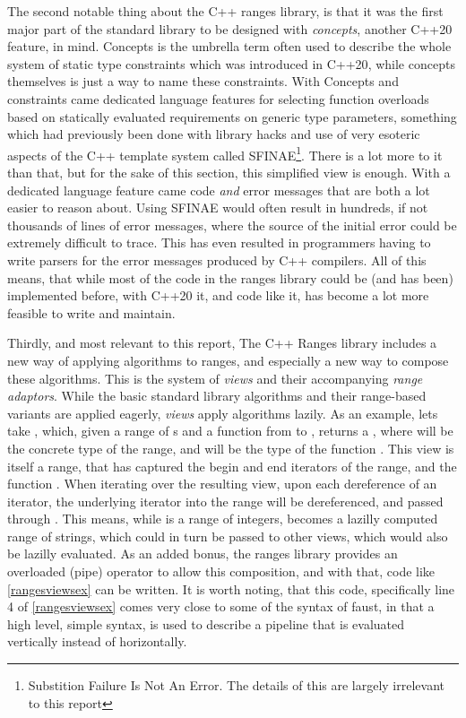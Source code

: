 The second notable thing about the C++ ranges library, is that it was the first major part of the standard library to be designed with \emph{concepts}, another C++20 feature\autocite{N4674}, in mind. Concepts is the umbrella term often used to describe the whole system of static type constraints which was introduced in C++20\autocite{P0724R0}, while concepts themselves is just a way to name these constraints. With Concepts and constraints came dedicated language features for selecting function overloads based on statically evaluated requirements on generic type parameters, something which had previously been done with library hacks  and use of very esoteric aspects of the C++ template system called SFINAE\footnote{Substition Failure Is Not An Error. The details of this are largely irrelevant to this report}. There is a lot more to it than that, but for the sake of this section, this simplified view is enough. With a dedicated language feature came code \emph{and} error messages that are both a lot easier to reason about. Using SFINAE would often result in hundreds, if not thousands of lines of error messages, where the source of the initial error could be extremely difficult to trace. This has even resulted in programmers having to write parsers for the error messages produced by C++ compilers\autocite{Raz2019}. All of this means, that while most of the code in the ranges library could be (and has been\autocite{range-v3}) implemented before, with C++20 it, and code like it, has become a lot more feasible to write and maintain.

Thirdly, and most relevant to this report, The C++ Ranges library includes a new way of applying algorithms to ranges, and especially a new way to compose these algorithms. This is the system of \emph{views} and their accompanying \emph{range adaptors}. While the basic standard library algorithms and their range-based variants are applied eagerly, \emph{views} apply algorithms lazily. As an example, lets take , which, given a range of s and a function from  to  , returns a , where  will be the concrete type of the  range, and  will be the type of the function . This view is itself a range, that has captured the begin and end iterators of the range, and the function . When iterating over the resulting view, upon each dereference of an iterator, the underlying iterator into the  range will be dereferenced, and passed through . This means, while  is a range of integers,  becomes a lazilly computed range of strings, which could in turn be passed to other views, which would also be lazilly evaluated. As an added bonus, the ranges library provides an overloaded \cpp{|} (pipe) operator to allow this composition, and with that, code like \autoref{rangesviewsex} can be written. It is worth noting, that this code, specifically line 4 of \autoref{rangesviewsex} comes very close to some of the syntax of faust, in that a high level, simple syntax, is used to describe a pipeline that is evaluated vertically instead of horizontally.


